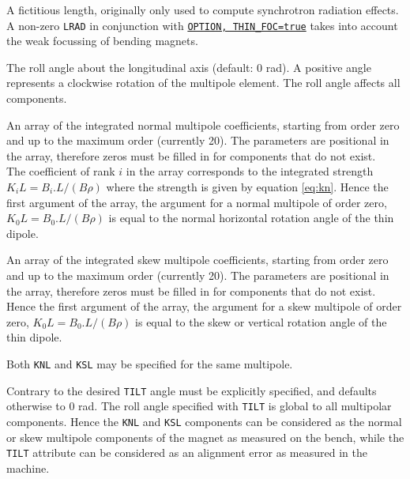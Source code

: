 \begin{madlist}
     A fictitious length, originally only used to
      compute synchrotron radiation effects. \\
      A non-zero \texttt{LRAD} in conjunction with
      \hyperref[sec:option]{\texttt{OPTION, THIN\_FOC=true}}
      takes into account the weak focussing of bending magnets.
      
     The roll angle about the longitudinal axis (default: 0
      rad). A positive angle represents a clockwise rotation of the
      multipole element. The roll angle affects all components.
      
     An array of the integrated normal multipole coefficients, 
      starting from order zero and up to the maximum order (currently 20). 
      The parameters are positional in the array, therefore 
      zeros must be filled in for components that do not exist. \\
      The coefficient of rank $i$ in the array corresponds to the integrated 
      strength $K_i L = B_i . L / (B\rho)$ where the strength is given by 
      equation \ref{eq:kn}. 
      Hence the first argument of the array, the argument for a normal
      multipole of order zero, $K_0 L = B_0 . L / (B\rho)$ is equal to
      the normal horizontal rotation angle of the thin dipole.
      
     An array of the integrated skew multipole coefficients, 
     starting from order zero and up to the maximum order (currently 20). The
     parameters are positional in the array, therefore zeros must be
     filled in for components that do not exist. 
     Hence the first argument of the array, the argument for a skew
     multipole of order zero, $K_0 L = B_0 . L / (B\rho)$ is equal to
     the skew or vertical rotation angle of the thin dipole.
 
\end{madlist}

Both \texttt{KNL} and \texttt{KSL} may be specified for the same multipole. 

Contrary to \madeight the desired \texttt{TILT} angle must be explicitly
specified, and defaults otherwise to 0 rad. The roll angle specified
with \texttt{TILT} is global to all multipolar components.  
Hence the \texttt{KNL} and \texttt{KSL} components can be considered as the
normal or skew multipole components of the magnet as measured on the
bench, while the \texttt{TILT} attribute can be considered as an alignment
error as measured in the machine.

